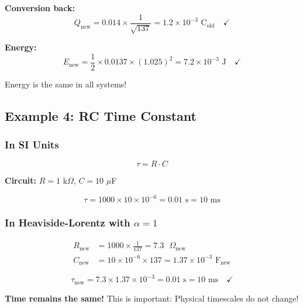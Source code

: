 	\textbf{Conversion back:}
	\begin{equation}
		Q_{\text{new}} = 0.014 \times \frac{1}{\sqrt{137}} = 1.2 \times 10^{-3} \text{ C}_{\text{old}} \quad \checkmark
	\end{equation}
	
	\textbf{Energy:}
	\begin{equation}
		E_{\text{new}} = \frac{1}{2} \times 0.0137 \times (1.025)^2 = 7.2 \times 10^{-3} \text{ J} \quad \checkmark
	\end{equation}
	
	Energy is the same in all systems!
	
	\subsection{Example 4: RC Time Constant}
	
	\subsubsection{In SI Units}
	
	\begin{equation}
		\tau = R \cdot C
	\end{equation}
	
	\textbf{Circuit:} $R = 1$ k$\Omega$, $C = 10$ $\mu$F
	
	\begin{equation}
		\tau = 1000 \times 10 \times 10^{-6} = 0.01 \text{ s} = 10 \text{ ms}
	\end{equation}
	
	\subsubsection{In Heaviside-Lorentz with $\alpha = 1$}
	
	\begin{align}
		R_{\text{new}} &= 1000 \times \frac{1}{137} = 7.3 \text{ }\Omega_{\text{new}} \\
		C_{\text{new}} &= 10 \times 10^{-6} \times 137 = 1.37 \times 10^{-3} \text{ F}_{\text{new}}
	\end{align}
	
	\begin{equation}
		\tau_{\text{new}} = 7.3 \times 1.37 \times 10^{-3} = 0.01 \text{ s} = 10 \text{ ms} \quad \checkmark
	\end{equation}
	
	\textbf{Time remains the same!} This is important: Physical timescales do not change!
	
